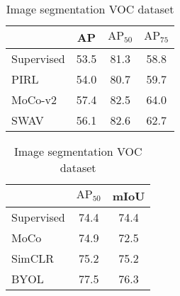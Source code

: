 \begin{table}[H]
	\begin{minipage}{.5\linewidth}
		\centering
		\begin{tabular}{l|ccc|}
			\cline{2-4} 
			& \multicolumn{1}{c|}{AP} & \multicolumn{1}{c|}{$\text{AP}_{50}$} & \multicolumn{1}{c|}{$\text{AP}_{75}$} \\ \hline
			\multicolumn{1}{|l|}{Supervised} & 53.5                   & 81.3                     & 58.8                     \\ \cline{1-1}
			\hline
			\multicolumn{1}{|l|}{PIRL}       & 54.0                  & 80.7                     & 59.7                     \\ \cline{1-1}
			\multicolumn{1}{|l|}{MoCo-v2}    & 57.4                   & 82.5                     & 64.0                     \\ \cline{1-1}
			\multicolumn{1}{|l|}{SWAV}       & 56.1                   & 82.6                     & 62.7                     \\ \cline{1-1}
			\hline
		\end{tabular}
		\caption{Object detection VOC dataset}
		\label{tab:object-detection}
	\end{minipage}%
	\begin{minipage}{.5\linewidth}
		\centering
		\begin{tabular}{l|cc|}
			\cline{2-3}
			& \multicolumn{1}{c|}{$\text{AP}_{50}$} & mIoU \\ \hline
			\multicolumn{1}{|l|}{Supervised} & \multicolumn{1}{c|}{74.4} & 74.4 \\ \hline
			\multicolumn{1}{|l|}{MoCo}       & \multicolumn{1}{c|}{74.9} & 72.5 \\ \cline{1-1}
			\multicolumn{1}{|l|}{SimCLR}     & \multicolumn{1}{c|}{75.2} & 75.2 \\ 
			\cline{1-1}
			\multicolumn{1}{|l|}{BYOL}       & \multicolumn{1}{c|}{77.5} & 76.3 \\ \hline
		\end{tabular}
		\caption{Image segmentation VOC dataset}
		\label{tab:semantic-segmentation}
	\end{minipage}
\end{table}